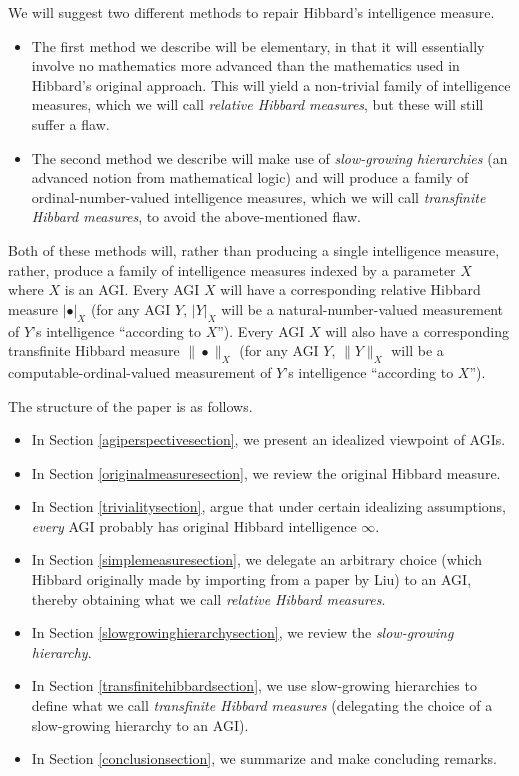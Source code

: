 \documentclass{article}
\begin{document}
We will suggest two different methods to repair Hibbard's intelligence measure.
\begin{itemize}
    \item
    The first method we describe will be elementary, in that it will
    essentially involve
    no mathematics more advanced than the mathematics used in Hibbard's original approach.
    This will yield a non-trivial family of intelligence measures,
    which we will call \emph{relative Hibbard measures}, but these will still suffer a flaw.
    \item
    The second method we describe will make use of \emph{slow-growing hierarchies}
    \cite{weiermann2002slow} (an advanced notion from mathematical logic) and will
    produce a family of ordinal-number-valued intelligence measures, which we will
    call \emph{transfinite Hibbard measures}, to avoid the above-mentioned flaw.
\end{itemize}
Both of these methods will, rather than producing a single intelligence measure,
rather, produce a family of intelligence measures indexed by a parameter $X$ where
$X$ is an AGI.
Every AGI $X$ will have a corresponding relative Hibbard measure $|\bullet|_X$
(for any AGI $Y$, $|Y|_X$ will be a natural-number-valued measurement of $Y$'s intelligence
``according to $X$'').
Every AGI $X$ will also have a corresponding transfinite Hibbard measure
$\|\bullet\|_X$
(for any AGI $Y$, $\|Y\|_X$ will be a computable-ordinal-valued measurement of $Y$'s
intelligence ``according to $X$'').

The structure of the paper is as follows.
\begin{itemize}
    \item
    In Section \ref{agiperspectivesection}, we present an idealized viewpoint of AGIs.
    \item
    In Section \ref{originalmeasuresection}, we review the original Hibbard measure.
    \item
    In Section \ref{trivialitysection}, argue that
    under certain idealizing assumptions, \emph{every} AGI probably has
    original Hibbard intelligence $\infty$.
    \item
    In Section \ref{simplemeasuresection}, we delegate an arbitrary choice
    (which Hibbard originally made by importing from a paper by Liu) to an AGI,
    thereby obtaining what we call \emph{relative Hibbard measures}.
    \item
    In Section \ref{slowgrowinghierarchysection}, we review the \emph{slow-growing hierarchy}.
    \item
    In Section \ref{transfinitehibbardsection}, we use
    slow-growing hierarchies to define what we call \emph{transfinite Hibbard measures}
    (delegating the choice of a slow-growing hierarchy to an AGI).
    \item
    In Section \ref{conclusionsection}, we summarize and make concluding remarks.
\end{itemize}
\end{document}

